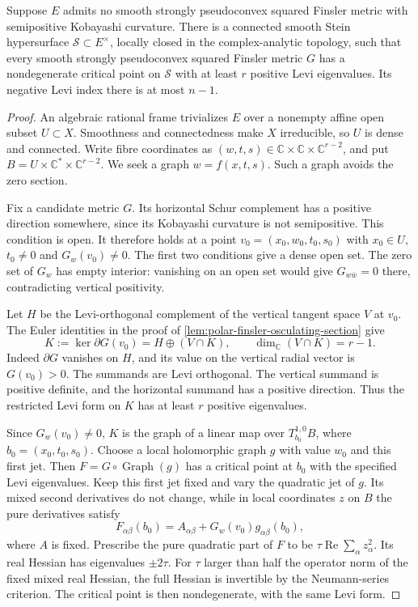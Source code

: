 \begin{theorem}\label{thm:fixed-stein-finsler-hypersurface}
Suppose $E$ admits no smooth strongly pseudoconvex squared Finsler
metric with semipositive Kobayashi curvature. There is a connected
smooth Stein hypersurface $\mathcal S\subset E^\times$, locally closed
in the complex-analytic topology, such that every smooth strongly
pseudoconvex squared Finsler metric $G$ has a nondegenerate critical
point on $\mathcal S$ with at least $r$ positive Levi eigenvalues.
Its negative Levi index there is at most $n-1$.
\end{theorem}
\begin{proof}
An algebraic rational frame trivializes $E$ over a nonempty affine
open subset $U\subset X$. Smoothness and connectedness make $X$
irreducible, so $U$ is dense and connected. Write fibre coordinates as
$(w,t,s)\in\mathbb C\times\mathbb C\times\mathbb C^{r-2}$, and put
$B=U\times\mathbb C^*\times\mathbb C^{r-2}$.
We seek a graph $w=f(x,t,s)$. Such a graph avoids the zero section.

Fix a candidate metric $G$. Its horizontal Schur complement has a
positive direction somewhere, since its Kobayashi curvature is not
semipositive. This condition is open. It therefore holds at a point
$v_0=(x_0,w_0,t_0,s_0)$ with $x_0\in U$, $t_0\neq0$ and $G_w(v_0)\neq0$.
The first two conditions give a dense open set. The zero set of $G_w$
has empty interior: vanishing on an open set would give
$G_{w\bar w}=0$ there, contradicting vertical positivity.

Let $H$ be the Levi-orthogonal complement of the vertical tangent
space $V$ at $v_0$. The Euler identities in the proof of
\cref{lem:polar-finsler-osculating-section} give
\[
 K:=\ker\partial G(v_0)=H\oplus(V\cap K),
 \qquad \dim_{\mathbb C}(V\cap K)=r-1.
\]
Indeed $\partial G$ vanishes on $H$, and its value on the vertical radial
vector is $G(v_0)>0$. The summands are Levi orthogonal. The vertical
summand is positive definite, and the horizontal summand has a positive
direction. Thus the restricted Levi form on $K$ has at least $r$
positive eigenvalues.

Since $G_w(v_0)\neq0$, $K$ is the graph of a linear map over
$T_{b_0}^{1,0}B$, where $b_0=(x_0,t_0,s_0)$.
Choose a local holomorphic graph $g$ with value $w_0$ and this first jet.
Then $F=G\circ\operatorname{Graph}(g)$ has a critical point at $b_0$
with the specified Levi eigenvalues.
Keep this first jet fixed and vary the quadratic jet of $g$.
Its mixed second derivatives do not change, while in local coordinates
$z$ on $B$ the pure derivatives satisfy
\[
 F_{\alpha\beta}(b_0)=A_{\alpha\beta}+G_w(v_0)g_{\alpha\beta}(b_0),
\]
where $A$ is fixed. Prescribe the pure quadratic part of $F$ to be
$\tau\operatorname{Re}\sum_\alpha z_\alpha^2$.
Its real Hessian has eigenvalues $\pm2\tau$.
For $\tau$ larger than half the operator norm of the fixed mixed real
Hessian, the full Hessian is invertible by the Neumann-series criterion.
The critical point is then nondegenerate, with the same Levi form.


\end{proof}
